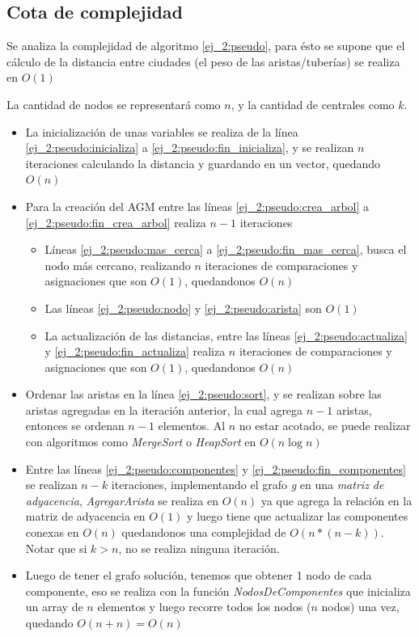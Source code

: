 \subsection{Cota de complejidad} \label{ej_2:cota}

Se analiza la complejidad de algoritmo \ref{ej_2:pseudo}, para \'esto se supone que el c\'alculo de la distancia entre ciudades (el peso de las aristas/tuber\'ias) se realiza en $O(1)$

La cantidad de nodos se representar\'a como $n$, y la cantidad de centrales como $k$.

\begin{itemize}
	\item La inicializaci\'on de unas variables se realiza de la l\'inea \ref{ej_2:pseudo:inicializa} a \ref{ej_2:pseudo:fin_inicializa}, y se realizan $n$ iteraciones calculando la distancia y guardando en un vector, quedando $O(n)$
	\item Para la creaci\'on del AGM entre las l\'ineas \ref{ej_2:pseudo:crea_arbol} a \ref{ej_2:pseudo:fin_crea_arbol} realiza $n - 1$ iteraciones
	\begin{itemize}
		\item L\'ineas \ref{ej_2:pseudo:mas_cerca} a \ref{ej_2:pseudo:fin_mas_cerca}, busca el nodo m\'as cercano, realizando $n$ iteraciones de comparaciones y asignaciones que son $O(1)$, quedandonos $O(n)$
		\item Las l\'ineas \ref{ej_2:pseudo:nodo} y \ref{ej_2:pseudo:arista} son $O(1)$
		\item La actualizaci\'on de las distancias, entre las l\'ineas \ref{ej_2:pseudo:actualiza} y \ref{ej_2:pseudo:fin_actualiza} realiza $n$ iteraciones de comparaciones y asignaciones que son $O(1)$, quedandonos $O(n)$
	\end{itemize}
	\item Ordenar las aristas en la l\'inea \ref{ej_2:pseudo:sort}, y se realizan sobre las aristas agregadas en la iteraci\'on anterior, la cual agrega $n-1$ aristas, entonces se ordenan $n - 1$ elementos. Al $n$ no estar acotado, se puede realizar con algoritmos como \emph{MergeSort} o \emph{HeapSort} en $O(n \log n)$
	\item Entre las l\'ineas \ref{ej_2:pseudo:componentes} y \ref{ej_2:pseudo:fin_componentes} se realizan $n - k$ iteraciones, implementando el grafo \emph{g} en una \emph{matriz de adyacencia}, \emph{AgregarArista} se realiza en $O(n)$ ya que agrega la relaci\'on en la matriz de adyacencia en $O(1)$ y luego tiene que actualizar las componentes conexas en $O(n)$ quedandonos una complejidad de $O(n * (n - k))$. Notar que si $k > n$, no se realiza ninguna iteraci\'on.
	\item Luego de tener el grafo soluci\'on, tenemos que obtener 1 nodo de cada componente, eso se realiza con la funci\'on \emph{NodosDeComponentes} que inicializa un array de $n$ elementos y luego recorre todos los nodos ($n$ nodos) una vez, quedando $O(n + n) = O(n)$
\end{itemize}

